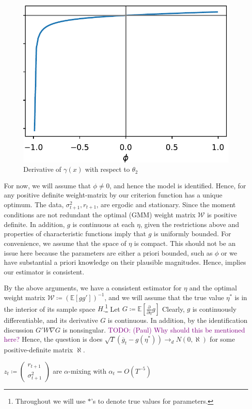 \documentclass[11pt]{article}
\newcommand{\purple}[1]{\textcolor{purple}{#1}}
\newcommand*{\W}{\mathcal{W}}
\newcommand*{\E}{\mathbb{E}}
\newcommand*{\N}{N}
\newcommand*{\dto}{\ensuremath{\to_d}}
\newcommand*{\Eta}{H}
\newcommand*{\popmom}{\ensuremath{g}}
\newcommand*{\sampmom}{\ensuremath{\overline{g}_t}}
\begin{document}
\begin{figure}[htb]
    \centering
    \caption{Derivative of $\gamma(x)$ with respect to $\theta_2$}
    \label{fig:fig:gamma_diff_theta2}
    \includegraphics[width=.5\textwidth]{gamma_diff_theta2.pdf}
\end{figure}


For now, we will assume that $\phi \neq 0$, and hence the model is identified.
Hence, for any positive definite weight-matrix by \textcite[Lemma 2.3]{newey1994large} our criterion function has
a unique optimum.
The data, $\sigma^2_{t+1}, r_{t+1}$, are ergodic and stationary.
Since the moment conditions are not redundant the optimal (GMM) weight matrix $\W$ is positive definite. 
In addition, $\popmom$ is continuous at each $\eta$, given the restrictions above and properties of characteristic
functions imply that $\popmom$ is uniformly bounded. 
For convenience, we assume that the space of $\eta$ is compact.
This should not be an issue here because the parameters  are either a priori bounded, such as $\phi$ or we have
substantial a priori knowledge on their plausible magnitudes.
Hence, \textcite[Theroem 2.6]{newey1994large} implies our estimator is consistent.

By the above arguments, we have a consistent estimator for $\eta$ and the optimal weight matrix $\W \coloneqq
(\E\left[g g'\right])^{-1}$, and we will assume that the true value $\eta^{*}$ is in the interior of its sample
space $\Eta$.\footnote{Throughout we will use $*$'s to denote true values for parameters.}
Let $G \coloneqq \E\left[\frac{\partial}{\partial \eta} \popmom \right]$
Clearly, $g$ is continuously differentiable, and its derivative $G$ is continuous.
In addition, by the identification discussion $G' W \nabla G$ is nonsingular.
\purple{TODO: (Paul) Why should this be mentioned here?}
Hence, the question is does $\sqrt{T} \left(\sampmom - \popmom(\eta^{*})\right) \dto \N(0, \aleph)$ for some
positive-definite matrix $\aleph$.

\begin{assump}
    \label{assumption:weak_dependence}
    $z_t \coloneqq \begin{pmatrix} r_{t+1} \\ \sigma^2_{t+1} \end{pmatrix}$ are $\alpha$-mixing with $\alpha_t =
       O\left(T^{-5}\right)$
\end{assump}
\end{document}
